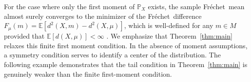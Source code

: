 \documentclass[preprint]{imsart}
\def\Frechet{Fr\'{e}chet}
\theoremstyle{plain}
\theoremstyle{remark}
\begin{document}

For the case where only the first moment of $\mathbb{P}_{X}$ exists, the sample \Frechet\ mean almost surely converges to the minimizer of the \Frechet\ difference $F_{\mu}(m) = \mathbb{E}[d^2(X,m) - d^2(X,\mu)]$, which is well-defined for any $m \in M$ provided that $\mathbb{E}[d(X,\mu)]<\infty$ \citep{sturm2003probability,schotz2022strong}. 
We emphasize that Theorem~\ref{thm:main} relaxes this finite first moment condition. 
In the absence of moment assumptions, a symmetry condition serves to identify a center of the distribution. 
%
The following example demonstrates that
the tail condition in Theorem~\ref{thm:main} is genuinely weaker than the finite
first-moment condition.
\end{document}
